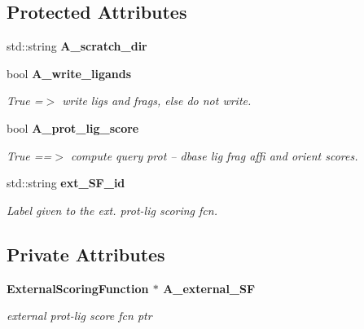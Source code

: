\subsection*{Protected Attributes}
\begin{CompactItemize}
\item 
std::string \textbf{A\_\-scratch\_\-dir}\label{classSimSite3D_1_1ScoreMapBase_784728589fd2db54ce16e5043db3c349}

\item 
bool \bf{A\_\-write\_\-ligands}\label{classSimSite3D_1_1ScoreMapBase_c11f067cce7e9e72f38b4cdc2abde485}

\begin{CompactList}\small\item\em True =$>$ write ligs and frags, else do not write. \item\end{CompactList}\item 
bool \bf{A\_\-prot\_\-lig\_\-score}\label{classSimSite3D_1_1ScoreMapBase_42d2d13e5fa5d7492495dd531246f8a5}

\begin{CompactList}\small\item\em True ==$>$ compute query prot -- dbase lig frag affi and orient scores. \item\end{CompactList}\item 
std::string \bf{ext\_\-SF\_\-id}\label{classSimSite3D_1_1ScoreMapBase_b6bfd4fcc3263c7ee1cc86c856cea184}

\begin{CompactList}\small\item\em Label given to the ext. prot-lig scoring fcn. \item\end{CompactList}\end{CompactItemize}
\subsection*{Private Attributes}
\begin{CompactItemize}
\item 
\bf{External\-Scoring\-Function} $\ast$ \bf{A\_\-external\_\-SF}\label{classSimSite3D_1_1ScoreMapBase_490667b180269340cbf0017b282eabb6}

\begin{CompactList}\small\item\em external prot-lig score fcn ptr \item\end{CompactList}\end{CompactItemize}


